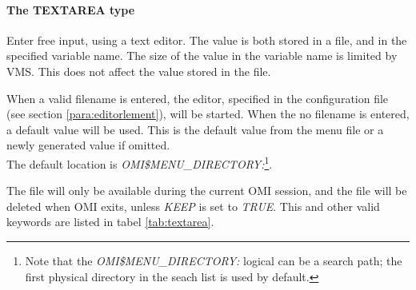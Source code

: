 \documentclass[a4paper]{book}
\newcommand{\vs}{\vspace{3mm}}
\begin{document}
\paragraph{The TEXTAREA type}
\label{para:mylabel5}

Enter free input, using a text editor. The value is both stored in a file, 
and in the specified variable name. The size of the value in the variable 
name is limited by VMS. This does not affect the value stored in the file.

\vs

When a valid filename is entered, the editor, specified in the configuration 
file (see section \ref{para:editorlement}), will be started. When 
the no filename is entered, a default value will be used. This is the 
default value from the menu file or a newly generated value if omitted. \\
The default location is \textsl{OMI{\$}MENU{\_}DIRECTORY:}\footnote{ Note that the
\textsl{OMI{\$}MENU{\_}DIRECTORY:} logical can be a search path; the first physical
directory in the seach list is used by default.}\label{fnote:slist}.
\setcounter{slist}{\value{footnote}}

\vs

The file will only be available during the current OMI session, and the file 
will be deleted when OMI exits, unless \textsl{KEEP} is set to \textsl{TRUE}.
This and other valid keywords are listed in tabel \ref{tab:textarea}.
\end{document}
